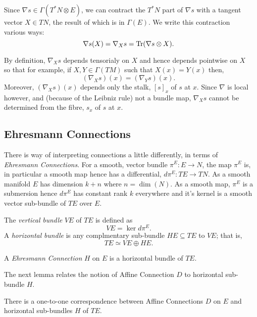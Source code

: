 \documentclass{amsart}
\begin{document}
\begin{rem}
Since \(\nabla s \in \Gamma(T^{\ast} N \otimes E)\), we can contract the \(T^{\ast} N\) part of \(\nabla s\) with a tangent vector \(X \in TN\), the result of which is in \(\Gamma(E)\). We write this contraction various ways:
\[
\nabla s (X) = \nabla_X s = \operatorname{Tr} (\nabla s \otimes X).
\]

By definition, \(\nabla_X s\) depends tensorialy on \(X\) and hence depends pointwise on \(X\) so that for example, if \(X, Y \in \Gamma(TM)\) such that \(X(x) = Y(x)\) then,
\[
(\nabla_X s) (x) = (\nabla_Y s) (x).
\]
Moreover, \((\nabla_X s) (x)\) depends only the stalk, \([s]_x\) of \(s\) at \(x\). Since \(\nabla\) is local however, and (because of the Leibniz rule) not a bundle map, \(\nabla_X s\) cannot be determined from the fibre, \(s_x\) of \(s\) at \(x\).
\end{rem}

\subsection{Ehresmann Connections}

There is way of interpreting connections a little differently, in terms of \emph{Ehresmann Connections}. For a smooth, vector bundle \(\pi^E : E \to N\), the map \(\pi^E\) is, in particular a smooth map hence has a differential, \(d\pi^E : TE \to TN\). As a smooth manifold \(E\) has dimension \(k+n\) where \(n = \operatorname{dim} (N)\). As a smooth map, \(\pi^E\) is a submersion hence \(d\pi^E\) has constant rank \(k\) everywhere and it's kernel is a smooth vector sub-bundle of \(TE\) over \(E\).

\begin{defn}
The \emph{vertical bundle} \(VE\) of \(TE\) is defined as
\[
VE = \operatorname{ker} d\pi^E.
\]
A \emph{horizontal bundle} is any complmentary sub-bundle \(HE \subseteq TE\) to \(VE\); that is,
\[
TE \simeq VE \oplus HE.
\]
\end{defn}

\begin{defn}
A \emph{Ehresmann Connection} \(H\) on \(E\) is a horizontal bundle of \(TE\).
\end{defn}

The next lemma relates the notion of Affine Connection \(D\) to horizontal sub-bundle \(H\).

\begin{lemma}
There is a one-to-one correspondence between Affine Connections \(D\) on \(E\) and horizontal sub-bundles \(H\) of \(TE\).
\end{lemma}
\end{document}
